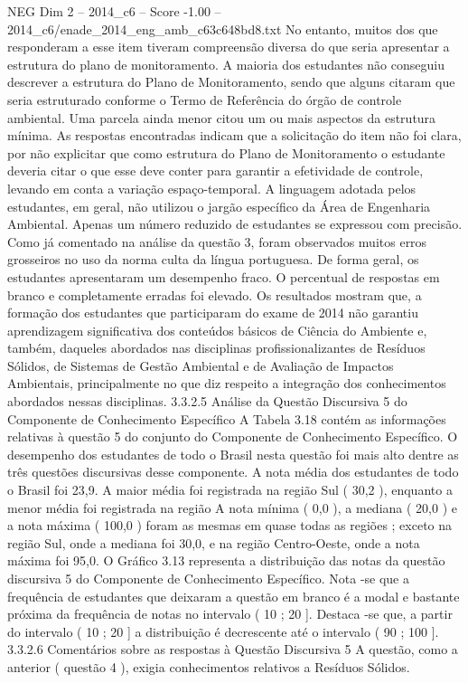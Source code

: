 \begin{textsample}{NEG Dim 2 – 2014\_c6 – Score -1.00 – 2014\_c6/enade\_2014\_eng\_amb\_c63c648bd8.txt}
No entanto, muitos dos que responderam a esse item tiveram compreensão diversa do que seria apresentar a estrutura do plano de monitoramento.
A maioria dos estudantes não conseguiu descrever a estrutura do Plano de Monitoramento, sendo que alguns citaram que seria estruturado conforme o Termo de Referência do órgão de controle ambiental.
Uma parcela ainda menor citou um ou mais aspectos da estrutura mínima.
As respostas encontradas indicam que a solicitação do item não foi clara, por não explicitar que como estrutura do Plano de Monitoramento o estudante deveria citar o que esse deve conter para garantir a efetividade de controle, levando em conta a variação espaço-temporal.
A linguagem adotada pelos estudantes, em geral, não utilizou o jargão específico da Área de Engenharia Ambiental.
Apenas um número reduzido de estudantes se expressou com precisão.
Como já comentado na análise da questão 3, foram observados muitos erros grosseiros no uso da norma culta da língua portuguesa.
De forma geral, os estudantes apresentaram um desempenho fraco.
O percentual de respostas em branco e completamente erradas foi elevado.
Os resultados mostram que, a formação dos estudantes que participaram do exame de 2014 não garantiu aprendizagem significativa dos conteúdos básicos de Ciência do Ambiente e, também, daqueles abordados nas disciplinas profissionalizantes de Resíduos Sólidos, de Sistemas de Gestão Ambiental e de Avaliação de Impactos Ambientais, principalmente no que diz respeito a integração dos conhecimentos abordados nessas disciplinas. 3.3.2.5 Análise da Questão Discursiva 5 do Componente de Conhecimento Específico A Tabela 3.18 contém as informações relativas à questão 5 do conjunto do Componente de Conhecimento Específico.
O desempenho dos estudantes de todo o Brasil nesta questão foi mais alto dentre as três questões discursivas desse componente.
A nota média dos estudantes de todo o Brasil foi 23,9.
A maior média foi registrada na região Sul ( 30,2 ), enquanto a menor média foi registrada na região A nota mínima ( 0,0 ), a mediana ( 20,0 ) e a nota máxima ( 100,0 ) foram as mesmas em quase todas as regiões ; exceto na região Sul, onde a mediana foi 30,0, e na região Centro-Oeste, onde a nota máxima foi 95,0.
O Gráfico 3.13 representa a distribuição das notas da questão discursiva 5 do Componente de Conhecimento Específico.
Nota -se que a frequência de estudantes que deixaram a questão em branco é a modal e bastante próxima da frequência de notas no intervalo ( 10 ; 20 ].
Destaca -se que, a partir do intervalo ( 10 ; 20 ] a distribuição é decrescente até o intervalo ( 90 ; 100 ]. 3.3.2.6 Comentários sobre as respostas à Questão Discursiva 5 A questão, como a anterior ( questão 4 ), exigia conhecimentos relativos a Resíduos Sólidos.

\end{textsample}
